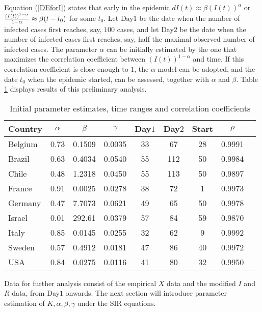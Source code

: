\documentclass{article}
\begin{document}
\bigskip

Equation (\ref{DEforI}) states that early in the epidemic $dI(t) \approx \beta (I(t))^\alpha$ or ${{(I(t))^{1-\alpha}} \over  {1-\alpha}} \approx \beta (t-t_0)$ for some $t_0$. Let Day$1$ be the date when the number of infected cases first reaches, say, $100$ cases, and let Day$2$ be the date when the number of infected cases first reaches, say, half the maximal observed number of infected cases. The parameter $\alpha$ can be initially estimated by the one that maximizes the correlation coefficient between $(I(t))^{1-\alpha}$ and time. If this correlation coefficient is close enough to $1$, the $\alpha$-model can be adopted, and the date $t_0$ when the epidemic started, can be assessed, together with $\alpha$ and $\beta$. Table \ref{tabl} displays results of this preliminary analysis.

\begin{table}
\begin{center}
\begin{tabular}{l|ccccccc|r}
Country & $\alpha$ & $\beta$ & $\gamma$ & Day$1$ & Day$2$ & Start & $\rho$ & \\ \hline
Belgium & 0.73  & 0.1509   & 0.0035   & 33   & 67   &  28  & 0.9991   &    \\ 
Brazil  & 0.63    & 0.4034       &  0.0540     & 55   & 112   & 50   & 0.9984      &   \\
Chile   & 0.48 & 1.2318 &0.0450 &  55 &  113 & 50 & 0.9897 &  \\
France  & 0.91 & 0.0025 &  0.0278& 38 & 72 & 1 & 0.9973 &  \\ 
Germany & 0.47 & 7.7073 &0.0621 & 49 &  65 & 50 & 0.9978 &   \\
Israel & 0.01 &  292.61 & 0.0379 & 57 &  84& 59 & 0.9870 & \\
Italy  & 0.85 & 0.0145 & 0.0255 &  32 & 62 & 9 & 0.9992 &  \\
Sweden &0.57 &0.4912 & 0.0181 & 47 &  86 & 40 & 0.9972 &     \\
USA   & 0.84 & 0.0275 & 0.0116 & 41 &  80 & 32 & 0.9950 &    \\ \hline
\end{tabular}
\caption{
Initial parameter estimates, time ranges and correlation coefficients
\label{tabl}
}
\end{center}
\end{table}


\bigskip

Data for further analysis consist of the empirical $X$ data and the modified $I$ and $R$ data, from Day$1$ onwards. The next section will introduce parameter estimation of $K,\alpha, \beta,\gamma$ under the SIR equations.
\end{document}
